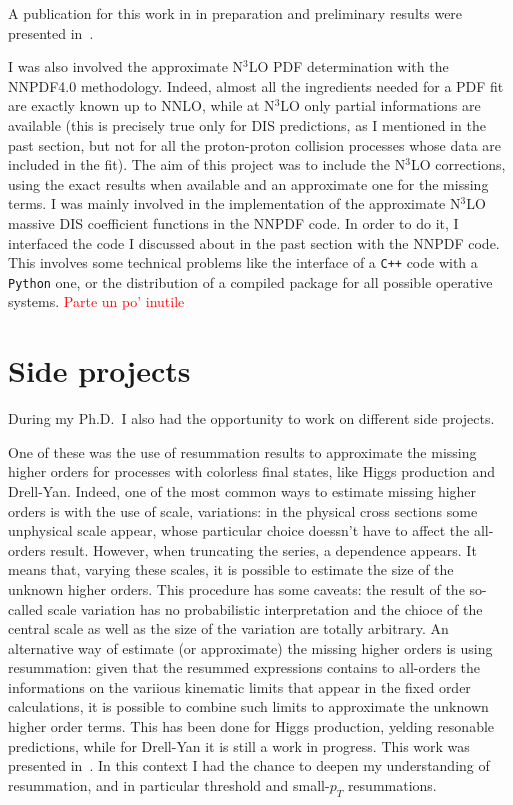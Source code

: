 \documentclass[11pt,a4paper]{moderncv}        %
\begin{document}
A publication for this work in in preparation and preliminary results were presented in~\cite{LAURENTI2023}.

I was also involved the approximate N$^3$LO PDF determination with the NNPDF4.0 methodology.
Indeed, almost all the ingredients needed for a PDF fit are exactly known up to NNLO, while at N$^3$LO only partial informations
are available (this is precisely true only for DIS predictions, as I mentioned in the past section, but not for all the proton-proton
collision processes whose data are included in the fit).
The aim of this project was to include the N$^3$LO corrections, using the exact results when available and an approximate one
for the missing terms.
I was mainly involved in the implementation of the approximate N$^3$LO massive DIS coefficient functions in the NNPDF code.
In order to do it, I interfaced the code I discussed about in the past section with the NNPDF code.
This involves some technical problems like the interface of a \texttt{C++} code with a \texttt{Python} one, or the distribution of
a compiled package for all possible operative systems. \textcolor{red}{Parte un po' inutile}


\section{Side projects}

During my Ph.D.\ I also had the opportunity to work on different side projects.

One of these was the use of resummation results to approximate the missing higher orders for processes with colorless final states,
like Higgs production and Drell-Yan.
Indeed, one of the most common ways to estimate missing higher orders is with the use of scale, variations:
in the physical cross sections some unphysical scale appear, whose particular choice doessn't have to affect the all-orders result.
However, when truncating the series, a dependence appears.
It means that, varying these scales, it is possible to estimate the size of the unknown higher orders.
This procedure has some caveats: the result of the so-called scale variation has no probabilistic interpretation and the chioce of
the central scale as well as the size of the variation are totally arbitrary.
An alternative way of estimate (or approximate) the missing higher orders is using resummation: given that the resummed expressions
contains to all-orders the informations on the variious kinematic limits that appear in the fixed order calculations, it is possible
to combine such limits to approximate the unknown higher order terms.
This has been done for Higgs production, yelding resonable predictions, while for Drell-Yan it is still a work in progress.
This work was presented in~\cite{laurenti2022approximating}.
In this context I had the chance to deepen my understanding of resummation, and in particular threshold and small-$p_T$ resummations.
\end{document}
